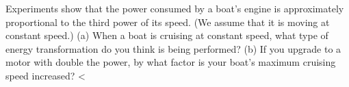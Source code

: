         Experiments show that the power consumed by a boat's
        engine is approximately proportional to the third power of its
        speed. (We assume that it is moving at constant speed.)\hwendpart
         (a)
        When a boat is cruising at constant speed, what type of
        energy transformation do you think is being performed? \hwendpart
        (b)
        If you upgrade to a motor with double the power, by what
        factor is your boat's maximum cruising speed increased?
        <%
